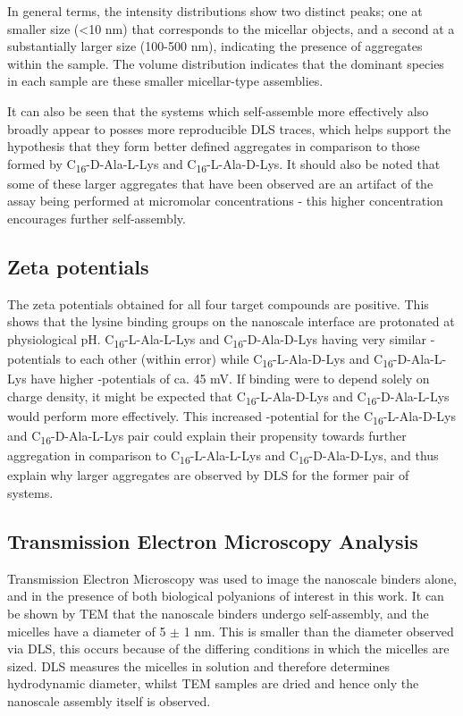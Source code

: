 In general terms, the intensity distributions show two distinct peaks; one at smaller size (<10 nm) that corresponds to the micellar objects, and a second at a substantially larger size (100-500 nm), indicating the presence of aggregates within the sample. The volume distribution indicates that the dominant species in each sample are these smaller micellar-type assemblies.  

It can also be seen that the systems which self-assemble more effectively also broadly appear to posses more reproducible DLS traces, which helps support the hypothesis that they form better defined aggregates in comparison to those formed by C\textsubscript{16}-D-Ala-L-Lys and C\textsubscript{16}-L-Ala-D-Lys. It should also be noted that some of these larger aggregates that have been observed are an artifact of the assay being performed at micromolar concentrations - this higher concentration  encourages further self-assembly. 

\subsection{Zeta potentials}
The zeta potentials obtained for all four target compounds are positive. This shows that the lysine binding groups on the nanoscale interface are protonated at physiological pH. 
\newline
C\textsubscript{16}-L-Ala-L-Lys and C\textsubscript{16}-D-Ala-D-Lys having very similar \textzeta-potentials to each other (within error) while C\textsubscript{16}-L-Ala-D-Lys and C\textsubscript{16}-D-Ala-L-Lys have higher \textzeta-potentials of ca. 45 mV. If binding were to depend solely on charge density, it might be expected that C\textsubscript{16}-L-Ala-D-Lys and C\textsubscript{16}-D-Ala-L-Lys would perform more effectively.\textsuperscript{\cite{Chan2016ChiralBinding}} 
\newline
This increased \textzeta -potential for the C\textsubscript{16}-L-Ala-D-Lys and C\textsubscript{16}-D-Ala-L-Lys pair could explain their propensity towards further aggregation in comparison to C\textsubscript{16}-L-Ala-L-Lys and C\textsubscript{16}-D-Ala-D-Lys, and thus explain why larger aggregates are observed by DLS for the former pair of systems.

\subsection{Transmission Electron Microscopy Analysis}
Transmission Electron Microscopy was used to image the nanoscale binders alone, and in the presence of both biological polyanions of interest in this work. It can be shown by TEM that the nanoscale binders undergo self-assembly, and the micelles have a diameter of 5 $\pm$ 1 nm. This is smaller than the diameter observed via DLS, this occurs because of the differing conditions in which the micelles are sized. DLS measures the micelles in solution and therefore determines hydrodynamic diameter, whilst TEM samples are dried and hence only the nanoscale assembly itself is observed. 

